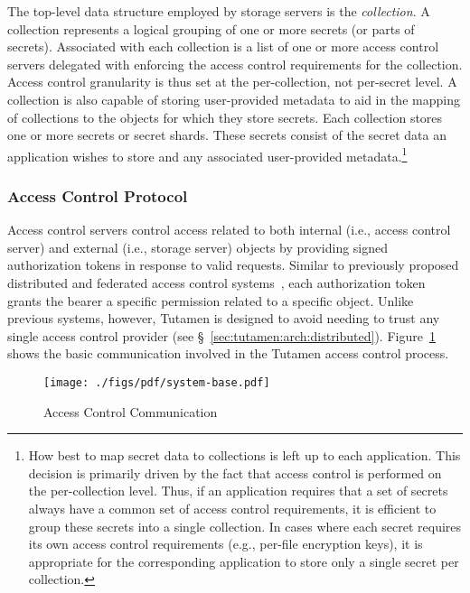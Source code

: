 The top-level data structure employed by storage servers is the
\textit{collection}. A collection represents a logical grouping of one
or more secrets (or parts of secrets). Associated with each collection
is a list of one or more access control servers delegated with
enforcing the access control requirements for the collection. Access
control granularity is thus set at the per-collection, not per-secret
level. A collection is also capable of storing user-provided metadata
to aid in the mapping of collections to the objects for which they
store secrets. Each collection stores one or more secrets or secret
shards. These secrets consist of the secret data an application wishes
to store and any associated user-provided metadata.\footnote{How best
  to map secret data to collections is left up to each
  application. This decision is primarily driven by the fact that
  access control is performed on the per-collection level. Thus, if an
  application requires that a set of secrets always have a common set
  of access control requirements, it is efficient to group these
  secrets into a single collection.  In cases where each secret
  requires its own access control requirements (e.g., per-file
  encryption keys), it is appropriate for the corresponding
  application to store only a single secret per collection.}

\subsubsection{Access Control Protocol}
\label{sec:tutamen:arch:acp}

Access control servers control access related to both internal (i.e.,
access control server) and external (i.e., storage server) objects by
providing signed authorization tokens in response to valid
requests. Similar to previously proposed distributed and federated
access control systems~\cite{calero2010, leandro2012, neuman1994},
each authorization token grants the bearer a specific permission
related to a specific object. Unlike previous systems, however,
Tutamen is designed to avoid needing to trust any single access
control provider (see \S~\ref{sec:tutamen:arch:distributed}).
Figure~\ref{fig:tutamen:systembase} shows the basic communication
involved in the Tutamen access control process.

\begin{figure}[th]
  \centering
  \texttt{[image: ./figs/pdf/system-base.pdf]}
  \caption{Access Control Communication}
  \label{fig:tutamen:systembase}
\end{figure}

